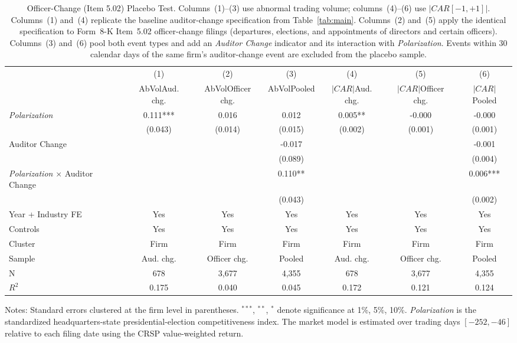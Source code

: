 \begin{table}[htbp]
\centering
\caption{Officer-Change (Item 5.02) Placebo Test. Columns~(1)--(3) use abnormal trading volume; columns~(4)--(6) use $|CAR[-1,+1]|$. Columns~(1) and~(4) replicate the baseline auditor-change specification from Table~\ref{tab:main}. Columns~(2) and~(5) apply the identical specification to Form~8-K Item~5.02 officer-change filings (departures, elections, and appointments of directors and certain officers). Columns~(3) and~(6) pool both event types and add an \textit{Auditor Change} indicator and its interaction with \textit{Polarization}. Events within 30 calendar days of the same firm's auditor-change event are excluded from the placebo sample.}
\label{tab:placebo_502}
\begin{tabular}{lcccccc}
\toprule
 & (1) & (2) & (3) & (4) & (5) & (6) \\
 & AbVol\newline Aud. chg. & AbVol\newline Officer chg. & AbVol\newline Pooled & $|CAR|$\newline Aud. chg. & $|CAR|$\newline Officer chg. & $|CAR|$\newline Pooled \\
\midrule
\textit{Polarization} & 0.111*** & 0.016 & 0.012 & 0.005** & -0.000 & -0.000 \\
 & (0.043) & (0.014) & (0.015) & (0.002) & (0.001) & (0.001) \\
Auditor Change &  &  & -0.017 &  &  & -0.001 \\
 &  &  & (0.089) &  &  & (0.004) \\
\textit{Polarization} $\times$ Auditor Change &  &  & 0.110** &  &  & 0.006*** \\
 &  &  & (0.043) &  &  & (0.002) \\
\midrule
Year + Industry FE & Yes & Yes & Yes & Yes & Yes & Yes \\
Controls & Yes & Yes & Yes & Yes & Yes & Yes \\
Cluster & Firm & Firm & Firm & Firm & Firm & Firm \\
Sample & Aud. chg. & Officer chg. & Pooled & Aud. chg. & Officer chg. & Pooled \\
N & 678 & 3,677 & 4,355 & 678 & 3,677 & 4,355 \\
$R^2$ & 0.175 & 0.040 & 0.045 & 0.172 & 0.121 & 0.124 \\
\bottomrule
\end{tabular}
\begin{flushleft}
\footnotesize Notes: Standard errors clustered at the firm level in parentheses. $^{***}$, $^{**}$, $^{*}$ denote significance at 1\%, 5\%, 10\%. \textit{Polarization} is the standardized headquarters-state presidential-election competitiveness index. The market model is estimated over trading days $[-252,-46]$ relative to each filing date using the CRSP value-weighted return.
\end{flushleft}
\end{table}